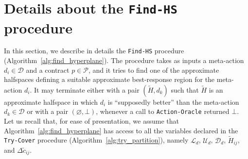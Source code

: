 
\section{Details about the \texttt{Find-HS} procedure}\label{sec:hyperplane}


In this section, we describe in details the \texttt{Find-HS} procedure (Algorithm~\ref{alg:find_hyperplane}).
%
%
The procedure takes as inputs a meta-action $d_i \in \mathcal{D}$ and a contract $p \in \mathcal{P}$, and it tries to find one of the approximate halfspaces defining a suitable approximate best-response region for the meta-action $d_i$.
%
It may terminate either with a pair $(\widetilde{H}, d_k)$ such that $\widetilde{H}$ is an approximate halfspace in which $d_i$ is ``supposedly better'' than the meta-action $d_k \in \mathcal{D}$ or with a pair $(\varnothing, \bot)$, whenever a call to \texttt{Action-Oracle} returned $\bot$.
%
Let us recall that, for ease of presentation, we assume that Algorithm~\ref{alg:find_hyperplane} has access to all the variables declared in the \texttt{Try-Cover} procedure (Algorithm~\ref{alg:try_partition}), namely $\mathcal{L}_d$, $\mathcal{U}_d$, $\mathcal{D}_d$, $\widetilde{H}_{ij}$, and $\Delta \widetilde{c}_{ij}$.
%



